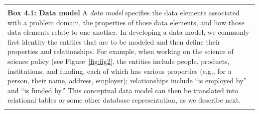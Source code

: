 \documentclass[]{krantz}
\newenvironment{F00}
    {\begin{center}
    \begin{tabular}{|p{0.9\textwidth}|}
    \hline\\
    }
    { 
    \\\\\hline
    \end{tabular} 
    \end{center}
    }
\begin{document}
\begin{F00}
\textbf{Box 4.1: Data model} A \emph{data model} specifies the data
elements associated with a problem domain, the properties of those data
elements, and how those data elements relate to one another. In
developing a data model, we commonly first identity the entities that
are to be modeled and then define their properties and relationships.
For example, when working on the science of science policy (see
Figure~\ref{fig:fig2}, the entities include people, products,
institutions, and funding, each of which has various properties (e.g.,
for a person, their name, address, employer); relationships include ``is
employed by'' and ``is funded by.'' This conceptual data model can then
be translated into relational tables or some other database
representation, as we describe next.
\end{F00}
\end{document}
